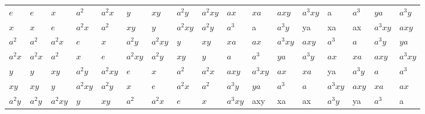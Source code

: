 {\begin{landscape}
\begin{table}[h]
\begin{tabular}{l|llllllllllllllll}
      $e$        &\cellcolor{blue!25} $e$        &\cellcolor{blue!25} $x$ &\cellcolor{blue!25} $a^{2}$ &\cellcolor{blue!25} $a^{2}x$ &\cellcolor{blue!25} $y$ &\cellcolor{blue!25} $xy$ &\cellcolor{blue!25} $a^{2}y$ &\cellcolor{blue!25} $a^{2}xy$ & $ax$ & $xa$ & $axy$ & $a^{3}xy$ & a & $a^{3}$ & $ya$ & $a^{3}y$ \\
      $x$        &\cellcolor{blue!25} $x$        &\cellcolor{blue!25} $e$        &\cellcolor{blue!25} $a^{2}x$ &\cellcolor{blue!25} $a^{2}$ & \cellcolor{blue!25}$xy$ &\cellcolor{blue!25} $y$ &\cellcolor{blue!25} $a^{2}xy$ &\cellcolor{blue!25} $a^{2}y$ & $a^{3}$ & a & $a^{3}y$ & ya & xa & ax & $a^{3}xy$ & $axy$ \\
      $a^{2}$  &\cellcolor{blue!25} $a^{2}$  &\cellcolor{blue!25} $a^{2}x$ &\cellcolor{blue!25} $e$ &\cellcolor{blue!25} $x$ &\cellcolor{blue!25} $a^{2}y$ &\cellcolor{blue!25} $a^{2}xy$ &\cellcolor{blue!25} $y$ &\cellcolor{blue!25} $xy$ & $xa$ & $ax$ & $a^{3}xy$ & $axy$ & $a^{3}$ & $a$ & $a^{3}y$ & $ya$ \\
      $a^{2}x$ &\cellcolor{blue!25} $a^{2}x$ &\cellcolor{blue!25} $a^{2}$  &\cellcolor{blue!25} $x$ &\cellcolor{blue!25} $e$ &\cellcolor{blue!25} $a^{2}xy$ &\cellcolor{blue!25} $a^{2}y$ &\cellcolor{blue!25} $xy$ &\cellcolor{blue!25} $y$ & $a$ & $a^{3}$ & $ya$ & $a^{3}y$ & $ax$ & $xa$ & $axy$ & $a^{3}xy$ \\
      $y$        &\cellcolor{blue!25} $y$        &\cellcolor{blue!25} $xy$        &\cellcolor{blue!25} $a^{2}y$ &\cellcolor{blue!25} $a^{2}xy$ & \cellcolor{blue!25}$e$ &\cellcolor{blue!25} $x$ &\cellcolor{blue!25} $a^{2}$ &\cellcolor{blue!25} $a^{2}x$ & $axy$ & $a^{3}xy$ & $ax$ & $xa$ & ya & $a^{3}y$ & $a$ & $a^{3}$ \\
      $xy$       &\cellcolor{blue!25} $xy$       &\cellcolor{blue!25} $y$        &\cellcolor{blue!25} $a^{2}xy$ &\cellcolor{blue!25} $a^{2}y$ & \cellcolor{blue!25}$x$ &\cellcolor{blue!25} $e$ &\cellcolor{blue!25} $a^{2}x$ &\cellcolor{blue!25} $a^{2}$ & $a^{3}y$ & $ya$ & $a^{3}$ & $a$ & $a^{3}xy$ & $axy$ & $xa$ & $ax$ \\
      $a^{2}y$ &\cellcolor{blue!25} $a^{2}y$ &\cellcolor{blue!25} $a^{2}xy$        &\cellcolor{blue!25} $y$ &\cellcolor{blue!25} $xy$ & \cellcolor{blue!25}$a^{2}$ &\cellcolor{blue!25} $a^{2}x$ &\cellcolor{blue!25} $e$ &\cellcolor{blue!25} $x$ & $a^{3}xy$ & axy & xa & ax & $a^{3}y$ & ya & $a^{3}$ & a \\

\end{tabular}
\end{table}
\end{landscape}}
